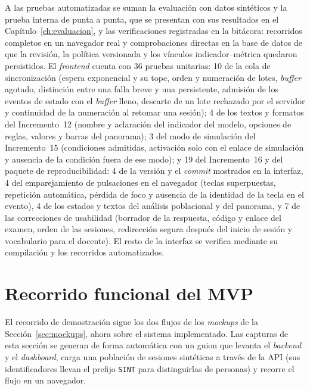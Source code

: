 A las pruebas automatizadas se suman la evaluación con datos sintéticos y la prueba interna de punta a punta, que se presentan con sus resultados en el Capítulo~\ref{ch:evaluacion}, y las verificaciones registradas en la bitácora: recorridos completos en un navegador real y comprobaciones directas en la base de datos de que la revisión, la política versionada y los vínculos indicador--métrica quedaron persistidos. El \textit{frontend} cuenta con 36 pruebas unitarias: 10 de la cola de sincronización (espera exponencial y su tope, orden y numeración de lotes, \textit{buffer} agotado, distinción entre una falla breve y una persistente, admisión de los eventos de estado con el \textit{buffer} lleno, descarte de un lote rechazado por el servidor y continuidad de la numeración al retomar una sesión); 4 de los textos y formatos del Incremento~12 (nombre y aclaración del indicador del modelo, opciones de reglas, valores y barras del panorama); 3 del modo de simulación del Incremento~15 (condiciones admitidas, activación solo con el enlace de simulación y ausencia de la condición fuera de ese modo); y 19 del Incremento~16 y del paquete de reproducibilidad: 4 de la versión y el \textit{commit} mostrados en la interfaz, 4 del emparejamiento de pulsaciones en el navegador (teclas superpuestas, repetición automática, pérdida de foco y ausencia de la identidad de la tecla en el evento), 4 de los estados y textos del análisis poblacional y del panorama, y 7 de las correcciones de usabilidad (borrador de la respuesta, código y enlace del examen, orden de las sesiones, redirección segura después del inicio de sesión y vocabulario para el docente). El resto de la interfaz se verifica mediante su compilación y los recorridos automatizados.

\section{Recorrido funcional del MVP}
\label{sec:impl_recorrido}

El recorrido de demostración sigue los dos flujos de los \textit{mockups} de la Sección~\ref{sec:mockups}, ahora sobre el sistema implementado. Las capturas de esta sección se generan de forma automática con un guion que levanta el \textit{backend} y el \textit{dashboard}, carga una población de sesiones sintéticas a través de la API (sus identificadores llevan el prefijo \texttt{SINT} para distinguirlas de personas) y recorre el flujo en un navegador.

